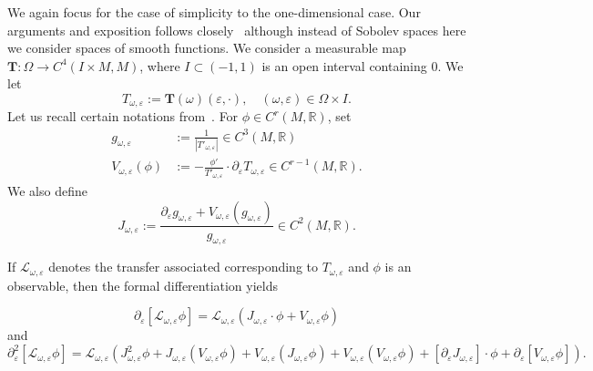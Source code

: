 \documentclass[11pt,reqno,a4paper]{article}
\theoremstyle{special}
\renewcommand{\epsilon}{\varepsilon}
\renewcommand{\L}{\mathcal{L}}
\def\R{\mathbb{R}}
\begin{document}
We again focus for the case of simplicity to the   one-dimensional case.  Our arguments and exposition follows closely~\cite[Section 4.4]{DGS} although instead of Sobolev spaces here we consider spaces of smooth functions.
We consider a measurable map
 $\mathbf T \colon \Omega \to C^4(I\times M, M)$, where $I\subset (-1, 1)$ is an open interval containing $0$. We let 
 \[
 T_{\omega, \epsilon}:=\mathbf T(\omega)(\epsilon, \cdot), \quad (\omega, \epsilon)\in \Omega \times I.
 \]
 Let us recall certain notations from~\cite{DGS}. For $\phi\in C^r(M, \R)$, set 
 \[
 \begin{split}
		g_{\omega,\epsilon}&:=\frac{1}{|T'_{\omega,\epsilon}|}\in C^{3}(M,\R)\\
		V_{\omega,\epsilon}(\phi) &:=-\frac{\phi'}{T'_{\omega,\epsilon}}\cdot\partial_\epsilon T_{\omega,\epsilon}\in C^{r-1}(M,\R).
  \end{split}
  \]
  We also define
	\[
		J_{\omega,\epsilon}:=\frac{\partial_\epsilon g_{\omega,\epsilon}+V_{\omega,\epsilon}(g_{\omega,\epsilon})}{g_{\omega,\epsilon}}\in C^{2}(M,\R).
	\]

If $\L_{\omega, \epsilon}$ denotes the transfer associated corresponding to $T_{\omega, \epsilon}$ and $\phi$ is an observable, then the formal differentiation yields
 
\[
		\partial_\epsilon [\L_{\omega,\epsilon}\phi]=\L_{\omega,\epsilon}(J_{\omega,\epsilon}\cdot\phi+V_{\omega,\epsilon}\phi)
  \]
  and 
  \[
		\partial_{\epsilon}^2[\L_{\omega, \epsilon}\phi]= \L_{{\omega,\epsilon}}\left(J_{\omega,\epsilon}^2\phi+J_{\omega,\epsilon}(V_{\omega,\epsilon}\phi)+V_{\omega,\epsilon}(J_{\omega,\epsilon}\phi)+V_{\omega,\epsilon}(V_{\omega,\epsilon}\phi)+[\partial_\epsilon J_{\omega,\epsilon}]\cdot \phi+\partial_{\epsilon}[V_{\omega,\epsilon}\phi]\right).
  \]
\end{document}

